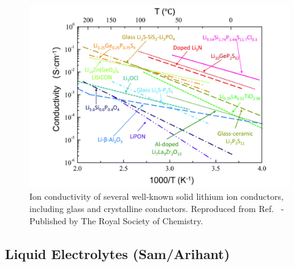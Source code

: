 \documentclass[../main.tex]{subfiles}
\begin{document}
\begin{figure}[htbp]
    \centering
    \includegraphics[scale=0.55]{figures/solid_electrolytes.pdf}
    \caption{Ion conductivity of several well-known solid lithium ion conductors, including glass and crystalline conductors. Reproduced from Ref.~ - Published by The Royal Society of Chemistry.}
    \label{fig:conductivity}
\end{figure}





\subsection{Liquid Electrolytes (Sam/Arihant)}
\label{sec:Liquid_electrolytes}
\end{document}
